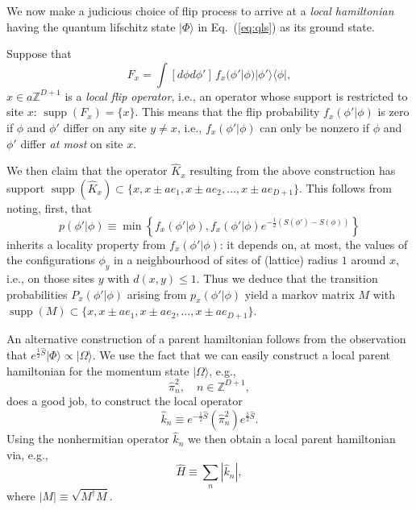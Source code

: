 \documentclass[twocolumn,lengthcheck,superscriptaddress]{revtex4-1}
\newcommand{\supp}{\operatorname{supp}}
\theoremstyle{definition}
\theoremstyle{remark}
\begin{document}
We now make a judicious choice of flip process to arrive at a \emph{local hamiltonian} having the quantum lifschitz state $|\Phi\rangle$ in Eq.~(\ref{eq:qls}) as its ground state. 

Suppose that 
\begin{equation}
	F_{x} = \int [d\phi d\phi']\, f_x(\phi'|\phi) |\phi'\rangle\langle \phi|,
\end{equation}
$x \in a\mathbb{Z}^{D+1}$ is a \emph{local flip operator}, i.e., an operator whose support is restricted to site $x$: $\supp(F_x) = \{x\}$. This means that the flip probability $f_x(\phi'|\phi)$ is zero if $\phi$ and $\phi'$ differ on any site $y\not=x$, i.e., $f_x(\phi'|\phi)$ can only be nonzero if $\phi$ and $\phi'$ differ \emph{at most} on site $x$.

We then claim that the operator $\widehat{K}_x$ resulting from the above construction has support $\supp(\widehat{K}_x) \subset \{x,x  \pm ae_{1}, x \pm ae_{2}, \ldots, x  \pm ae_{D+1}\}$. This follows from noting, first, that 
\begin{equation}
	p(\phi'|\phi) \equiv  \min\left\{f_x(\phi'|\phi), f_x(\phi'|\phi)e^{- \frac12 (S(\phi')-S(\phi))}\right\}
\end{equation}
inherits a locality property from $f_x(\phi'|\phi)$: it depends on, at most, the values of the configurations $\phi_y$ in a neighbourhood of sites of (lattice) radius $1$ around $x$, i.e., on those sites $y$ with $d(x,y) \le 1$. Thus we deduce that the transition probabilities $P_x(\phi'|\phi)$ arising from $p_x(\phi'|\phi)$ yield a markov matrix $M$ with $\supp(M) \subset \{x,x  \pm ae_{1}, x \pm ae_{2}, \ldots, x  \pm ae_{D+1}\}$.

An alternative construction of a parent hamiltonian follows from the observation that $e^{\frac12 \widehat{S}}|\Phi\rangle \propto |\Omega\rangle$. We use the fact that we can easily construct a local parent hamiltonian for the momentum state $|\Omega\rangle$, e.g., 
\begin{equation}
	\widehat{\pi}_n^2, \quad n\in \mathbb{Z}^{D+1},
\end{equation}
does a good job, to construct the local operator
\begin{equation}
	\widehat{k}_n \equiv e^{-\frac12\widehat{S}} (\widehat{\pi}_n^2) e^{\frac12\widehat{S}}.
\end{equation}	
Using the nonhermitian operator $\widehat{k}_n$ we then obtain a local parent hamiltonian via, e.g.,
\begin{equation}
	\widehat{H} \equiv \sum_{n} |\widehat{k}_n|,
\end{equation}
where $|M| \equiv \sqrt{M^\dag M}$. 
\end{document}
